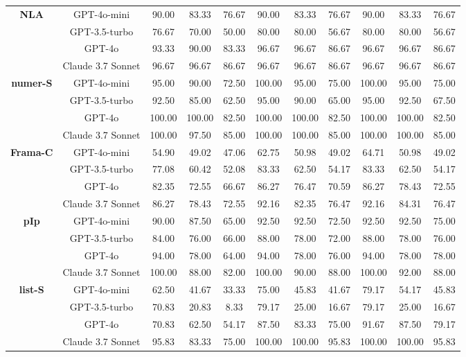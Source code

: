 \begin{table}[h!]
\begin{adjustbox}{max width=\textwidth}
\begin{tabular}{cc ccc ccc ccc}
\multirow{4}{*}{\textbf{NLA}}
 & GPT-4o-mini & 90.00 & 83.33 & 76.67 & 90.00 & 83.33 & 76.67 & 90.00 & 83.33 & 76.67 \\
 & GPT-3.5-turbo & 76.67 & 70.00 & 50.00 & 80.00 & 80.00 & 56.67 & 80.00 & 80.00 & 56.67 \\
& GPT-4o & 93.33 & 90.00 & 83.33 & 96.67 & 96.67 & 86.67 & 96.67 & 96.67 & 86.67 \\
& Claude 3.7 Sonnet & 96.67 & 96.67 & 86.67 & 96.67 & 96.67 & 86.67 & 96.67 & 96.67 & 86.67 \\
\midrule

\multirow{4}{*}{\textbf{numer-S}}
 & GPT-4o-mini & 95.00 & 90.00 & 72.50 & 100.00 & 95.00 & 75.00 & 100.00 & 95.00 & 75.00 \\
 & GPT-3.5-turbo & 92.50 & 85.00 & 62.50 & 95.00 & 90.00 & 65.00 & 95.00 & 92.50 & 67.50 \\
 & GPT-4o & 100.00 & 100.00 & 82.50 & 100.00 & 100.00 & 82.50 & 100.00 & 100.00 & 82.50 \\
 & Claude 3.7 Sonnet & 100.00 & 97.50 & 85.00 & 100.00 & 100.00 & 85.00 & 100.00 & 100.00 & 85.00 \\
\midrule

\multirow{4}{*}{\textbf{Frama-C}}
 & GPT-4o-mini & 54.90 & 49.02 & 47.06 & 62.75 & 50.98 & 49.02 & 64.71 & 50.98 & 49.02 \\
 & GPT-3.5-turbo & 77.08 & 60.42 & 52.08 & 83.33 & 62.50 & 54.17 & 83.33 & 62.50 & 54.17 \\
 & GPT-4o & 82.35 & 72.55 & 66.67 & 86.27 & 76.47 & 70.59 & 86.27 & 78.43 & 72.55 \\
 & Claude 3.7 Sonnet & 86.27 & 78.43 & 72.55 & 92.16 & 82.35 & 76.47 & 92.16 & 84.31 & 76.47 \\
\midrule

\multirow{4}{*}{\textbf{pIp}}
 & GPT-4o-mini & 90.00 & 87.50 & 65.00 & 92.50 & 92.50 & 72.50 & 92.50 & 92.50 & 75.00 \\
 & GPT-3.5-turbo & 84.00 & 76.00 & 66.00 & 88.00 & 78.00 & 72.00 & 88.00 & 78.00 & 76.00 \\
 & GPT-4o & 94.00 & 78.00 & 64.00 & 94.00 & 78.00 & 76.00 & 94.00 & 78.00 & 78.00 \\
 & Claude 3.7 Sonnet & 100.00 & 88.00 & 82.00 & 100.00 & 90.00 & 88.00 & 100.00 & 92.00 & 88.00 \\
\midrule

\multirow{4}{*}{\textbf{list-S}}
 & GPT-4o-mini & 62.50 & 41.67 & 33.33 & 75.00 & 45.83 & 41.67 & 79.17 & 54.17 & 45.83 \\
 & GPT-3.5-turbo & 70.83 & 20.83 & 8.33 & 79.17 & 25.00 & 16.67 & 79.17 & 25.00 & 16.67 \\
 & GPT-4o & 70.83 & 62.50 & 54.17 & 87.50 & 83.33 & 75.00 & 91.67 & 87.50 & 79.17 \\
 & Claude 3.7 Sonnet & 95.83 & 83.33 & 75.00 & 100.00 & 100.00 & 95.83 & 100.00 & 100.00 & 95.83 \\
\bottomrule
\end{tabular}
\end{adjustbox}
\end{table}




